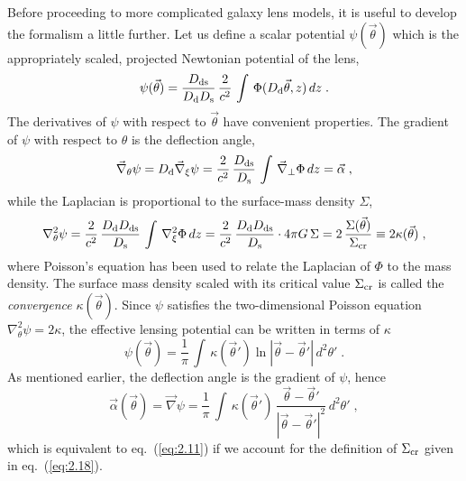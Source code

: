 \documentclass[a4paper,10pt]{article} %
\begin{document}
Before proceeding to more complicated galaxy lens models, it is useful
to develop the formalism a little further. Let us define a scalar
potential $\psi(\vec\theta)$ which is the appropriately scaled,
projected Newtonian potential of the lens,
\begin{equation}
  \psi(\vec\theta) = \frac{D_{\rm ds}}{D_{\rm d}D_{\rm s}}\,
  \frac{2}{c^2}\,\int\,\Phi(D_{\rm d}\vec\theta,z)\,dz\;.
\label{eq:3.11}
\end{equation}
The derivatives of $\psi$ with respect to $\vec\theta$ have convenient
properties. The gradient of $\psi$ with respect to $\theta$ is the
deflection angle,
\begin{equation}
  \vec\nabla_\theta\psi = D_{\rm d}\vec\nabla_\xi\psi =
  \frac{2}{c^2}\,\frac{D_{\rm ds}}{D_{\rm s}}\,
  \int\,\vec\nabla_\perp\Phi\,dz = \vec\alpha\;,
\label{eq:3.12}
\end{equation}
while the Laplacian is proportional to the surface-mass density
$\Sigma$,
\begin{equation}
  \nabla^2_\theta\psi =
  \frac{2}{c^2}\,\frac{D_{\rm d}D_{\rm ds}}{D_{\rm s}}\,
  \int\,\nabla_\xi^2\Phi\,dz =
  \frac{2}{c^2}\,\frac{D_{\rm d}D_{\rm ds}}{D_{\rm s}}\cdot
  4\pi G\,\Sigma =
  2\,\frac{\Sigma(\vec\theta)}{\Sigma_{\rm cr}} \equiv
  2\kappa(\vec\theta)\;,
\label{eq:3.13}
\end{equation}
where Poisson's equation has been used to relate the Laplacian of
$\Phi$ to the mass density. The surface mass density scaled with its
critical value $\Sigma_{\rm cr}$ is called the {\em convergence\/}
$\kappa(\vec\theta)$. Since $\psi$ satisfies the two-dimensional
Poisson equation $\nabla^2_\theta\psi=2\kappa$, the effective lensing
potential can be written in terms of $\kappa$
\begin{equation}
  \psi(\vec\theta) = \frac{1}{\pi}\,
  \int\,\kappa(\vec\theta')\ln|\vec\theta-\vec\theta'|\,
  d^2\theta'\;.
\label{eq:3.14}
\end{equation}
As mentioned earlier, the deflection angle is the gradient of $\psi$,
hence
\begin{equation}
  \vec\alpha(\vec\theta) = \vec\nabla\psi =
  \frac{1}{\pi}\,\int\,\kappa(\vec\theta')\,
  \frac{\vec\theta-\vec\theta'}{|\vec\theta-\vec\theta'|^2}\,
  d^2\theta'\;,
\label{eq:3.15}
\end{equation}
which is equivalent to eq.\ (\ref{eq:2.11}) if we account for the
definition of $\Sigma_{\rm cr}$ given in eq.\ (\ref{eq:2.18}).
\end{document}
